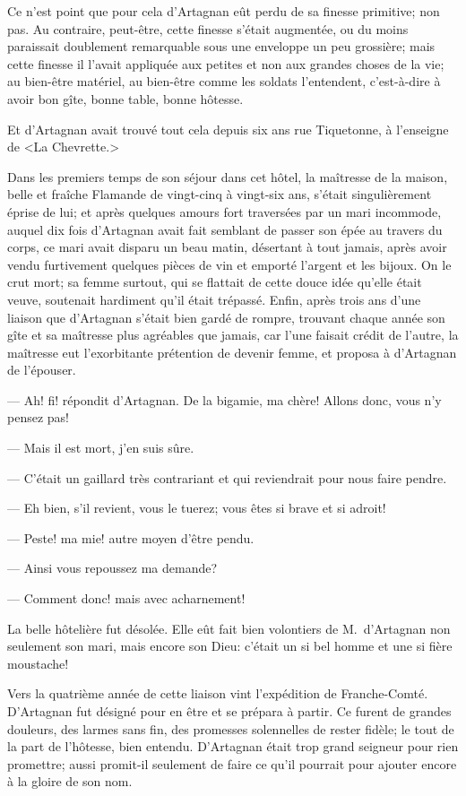 Ce n'est point que pour cela d'Artagnan eût perdu de sa finesse primitive; non pas. Au contraire, peut-être, cette finesse s'était augmentée, ou du moins paraissait doublement remarquable sous une enveloppe un peu grossière; mais cette finesse il l'avait appliquée aux petites et non aux grandes choses de la vie; au bien-être matériel, au bien-être comme les soldats l'entendent, c'est-à-dire à avoir bon gîte, bonne table, bonne hôtesse.

Et d'Artagnan avait trouvé tout cela depuis six ans rue Tiquetonne, à l'enseigne de <La Chevrette.>

Dans les premiers temps de son séjour dans cet hôtel, la maîtresse de la maison, belle et fraîche Flamande de vingt-cinq à vingt-six ans, s'était singulièrement éprise de lui; et après quelques amours fort traversées par un mari incommode, auquel dix fois d'Artagnan avait fait semblant de passer son épée au travers du corps, ce mari avait disparu un beau matin, désertant à tout jamais, après avoir vendu furtivement quelques pièces de vin et emporté l'argent et les bijoux. On le crut mort; sa femme surtout, qui se flattait de cette douce idée qu'elle était veuve, soutenait hardiment qu'il était trépassé. Enfin, après trois ans d'une liaison que d'Artagnan s'était bien gardé de rompre, trouvant chaque année son gîte et sa maîtresse plus agréables que jamais, car l'une faisait crédit de l'autre, la maîtresse eut l'exorbitante prétention de devenir femme, et proposa à d'Artagnan de l'épouser.

— Ah! fi! répondit d'Artagnan. De la bigamie, ma chère! Allons donc, vous n'y pensez pas!

— Mais il est mort, j'en suis sûre.

— C'était un gaillard très contrariant et qui reviendrait pour nous faire pendre.

— Eh bien, s'il revient, vous le tuerez; vous êtes si brave et si adroit!

— Peste! ma mie! autre moyen d'être pendu.

— Ainsi vous repoussez ma demande?

— Comment donc! mais avec acharnement!

La belle hôtelière fut désolée. Elle eût fait bien volontiers de M.~d'Artagnan non seulement son mari, mais encore son Dieu: c'était un si bel homme et une si fière moustache!

Vers la quatrième année de cette liaison vint l'expédition de Franche-Comté. D'Artagnan fut désigné pour en être et se prépara à partir. Ce furent de grandes douleurs, des larmes sans fin, des promesses solennelles de rester fidèle; le tout de la part de l'hôtesse, bien entendu. D'Artagnan était trop grand seigneur pour rien promettre; aussi promit-il seulement de faire ce qu'il pourrait pour ajouter encore à la gloire de son nom.

